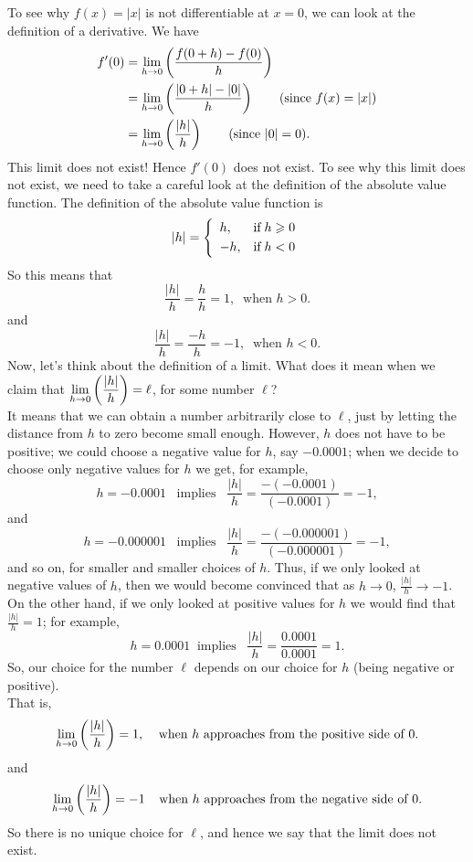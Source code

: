 \noindent To see why $f(x) = |x|$ is not differentiable at $x = 0$, we can look at the definition of a derivative. We have
\begin{align*}
f'(0) & = \lim_{h \rightarrow 0}\left(\frac{f(0+h) - f(0)}{h}\right) \\
	& = \lim_{h \rightarrow 0}\left(\frac{|0+h| - |0|}{h}\right) \tag{since $f(x) = |x|$} \\
	& = \lim_{h \rightarrow 0}\left(\frac{|h|}{h}\right) \tag{since $|0| = 0$}.
\end{align*}
This limit does not exist! Hence $f'(0)$ does not exist. To see why this limit does not exist, we need to take a careful look at the definition of the absolute value function. The definition of the absolute value function is
\[
\scases{|h|}{h}{\text{if} \; h \geq 0}{-h}{\text{if} \; h < 0}
\]
So this means that
\[
\frac{|h|}{h} = \frac{h}{h} = 1, \;\; \text{when $h > 0$}.
\]
and
\[
\frac{|h|}{h} = \frac{-h}{h} = -1, \;\; \text{when $h < 0$}.
\]
Now, let's think about the definition of a limit. What does it mean when we claim that $\displaystyle{\lim_{h \rightarrow 0}}\left(\frac{|h|}{h}\right) = \ell$, for some number $\ell$?\\

\noindent It means that we can obtain a number arbitrarily close to $\ell$, just by letting the distance from $h$ to zero become small enough. However, $h$ does not have to be positive; we could choose a negative value for $h$, say $-0.0001$; when we decide to choose only negative values for $h$ we get, for example,
\[
h = -0.0001 \;\;\; \text{implies} \;\;\; \frac{|h|}{h} = \frac{-(-0.0001)}{(-0.0001)} = -1,
\]
and
\[
h = -0.000001 \;\;\; \text{implies} \;\;\; \frac{|h|}{h} = \frac{-(-0.000001)}{(-0.000001)} = -1,
\]
and so on, for smaller and smaller choices of $h$. Thus, if we only looked at negative values of $h$, then we would become convinced that as $h \rightarrow 0$, $\frac{|h|}{h} \rightarrow -1$. On the other hand, if we only looked at positive values for $h$ we would find that $\frac{|h|}{h} = 1$; for example,
\[
h = 0.0001 \;\; \text{implies} \;\;\; \frac{|h|}{h} = \frac{0.0001}{0.0001} = 1.
\]
So, our choice for the number $\ell$ depends on our choice for $h$ (being negative or positive). \\

\noindent That is,
\[
\lim_{h\rightarrow 0}\left(\frac{|h|}{h}\right) = 1, \;\;\;\; \text{when $h$ approaches from the positive side of $0$.}
\]
and
\[
\lim_{h \rightarrow 0}\left(\frac{|h|}{h}\right) = -1 \;\;\;\; \text{when $h$ approaches from the negative side of $0$.}
\]
So there is no unique choice for $\ell$, and hence we say that the limit does not exist. \\

